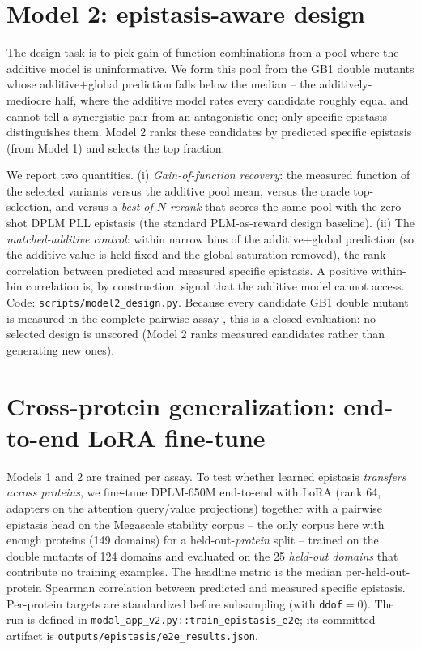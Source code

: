 \documentclass{article}
\begin{document}
\section{Model 2: epistasis-aware design}
\label{sec:model2}

The design task is to pick gain-of-function combinations from a pool where the
additive model is uninformative. We form this pool from the GB1 double mutants
whose additive$+$global prediction falls below the median -- the additively-mediocre half,
where the additive model rates every candidate roughly equal and cannot tell a
synergistic pair from an antagonistic one; only specific epistasis distinguishes
them. Model 2 ranks these candidates by predicted specific epistasis (from Model
1) and selects the top fraction.

We report two quantities. (i) \emph{Gain-of-function recovery}: the measured
function of the selected variants versus the additive pool mean, versus the
oracle top-selection, and versus a \emph{best-of-$N$ rerank} that scores the same
pool with the zero-shot DPLM PLL epistasis (the standard PLM-as-reward design
baseline). (ii) The \emph{matched-additive control}: within narrow bins of the
additive$+$global prediction (so the additive value is held fixed and the global
saturation removed), the rank correlation
between predicted and measured specific epistasis. A positive within-bin
correlation is, by construction, signal that the additive model cannot access.
Code: \texttt{scripts/model2\_design.py}. Because every candidate GB1 double
mutant is measured in the complete pairwise assay
\citep{olson2014comprehensive}, this is a closed evaluation: no selected design
is unscored (Model 2 ranks measured candidates rather than generating new ones).

\section{Cross-protein generalization: end-to-end LoRA fine-tune}
\label{sec:e2e}

Models 1 and 2 are trained per assay. To test whether learned epistasis
\emph{transfers across proteins}, we fine-tune DPLM-650M end-to-end with LoRA
(rank 64, adapters on the attention query/value projections) together with a
pairwise epistasis head on the Megascale stability corpus -- the only corpus
here with enough proteins (149 domains) for a held-out-\emph{protein} split --
trained on the double mutants of 124 domains and evaluated on the 25
\emph{held-out domains} that contribute no training examples. The headline metric is the median per-held-out-protein Spearman
correlation between predicted and measured specific epistasis. Per-protein
targets are standardized before subsampling (with \texttt{ddof}$=0$). The run is
defined in \texttt{modal\_app\_v2.py::train\_epistasis\_e2e}; its committed
artifact is \texttt{outputs/epistasis/e2e\_results.json}.
\end{document}
